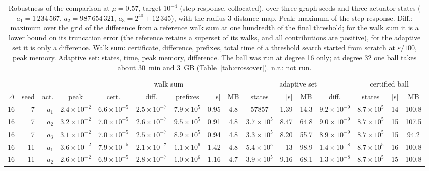 \begin{table}[t]
\footnotesize\setlength{\tabcolsep}{2.4pt}
\caption{Robustness of the comparison at $\mu=0.57$, target $10^{-4}$ (step response, collocated), over three graph seeds and three actuator states ($a_1=1\,234\,567$, $a_2=987\,654\,321$, $a_3=2^{40}+12\,345$), with the radius-3 distance map. Peak: maximum of the step response. Diff.: maximum over the grid of the difference from a reference walk sum at one hundredth of the final threshold; for the walk sum it is a lower bound on its truncation error (the reference retains a superset of its walks, and all contributions are positive), for the adaptive set it is only a difference. Walk sum: certificate, difference, prefixes, total time of a threshold search started from scratch at $\varepsilon/100$, peak memory. Adaptive set: states, time, peak memory, difference. The ball was run at degree 16 only; at degree 32 one ball takes about 30~min and 3~GB (Table~\ref{tab:crossover}). n.r.: not run.}\label{tab:ensemble}
\begin{ruledtabular}
\begin{tabular}{rrrc|cccrc|crcc|crc}
 & & & & \multicolumn{5}{c|}{walk sum} & \multicolumn{4}{c|}{adaptive set} & \multicolumn{3}{c}{certified ball}\\
$\Delta$ & seed & act. & peak & cert. & diff. & prefixes & [s] & MB & states & [s] & MB & diff. & states & [s] & MB\\\hline
16 & 7 & $a_1$ & $2.4\times10^{-2}$ & $6.6\times10^{-5}$ & $2.5\times10^{-7}$ & $7.9\times10^{5}$ & 0.95 & 4.8 & 57857 & 1.39 & 14.3 & $9.2\times10^{-9}$ & $8.7\times10^{5}$ & 14 & 100.8 \\
16 & 7 & $a_2$ & $3.2\times10^{-2}$ & $7.0\times10^{-5}$ & $2.6\times10^{-7}$ & $9.5\times10^{5}$ & 0.91 & 4.8 & $3.7\times10^{5}$ & 8.47 & 64.8 & $9.0\times10^{-9}$ & $8.7\times10^{5}$ & 15 & 107.5 \\
16 & 7 & $a_3$ & $3.1\times10^{-2}$ & $7.0\times10^{-5}$ & $2.5\times10^{-7}$ & $8.9\times10^{5}$ & 0.94 & 4.8 & $3.3\times10^{5}$ & 8.20 & 55.7 & $8.9\times10^{-9}$ & $8.7\times10^{5}$ & 15 & 94.2 \\
16 & 11 & $a_1$ & $3.6\times10^{-2}$ & $7.9\times10^{-5}$ & $2.1\times10^{-7}$ & $1.1\times10^{6}$ & 1.42 & 4.8 & $5.4\times10^{5}$ & 13 & 98.9 & $1.4\times10^{-8}$ & $8.7\times10^{5}$ & 16 & 100.8 \\
16 & 11 & $a_2$ & $2.6\times10^{-2}$ & $6.9\times10^{-5}$ & $2.8\times10^{-7}$ & $1.0\times10^{6}$ & 1.16 & 4.7 & $3.9\times10^{5}$ & 9.16 & 68.1 & $1.3\times10^{-8}$ & $8.7\times10^{5}$ & 15 & 100.8 \\

\end{tabular}
\end{ruledtabular}
\end{table}
